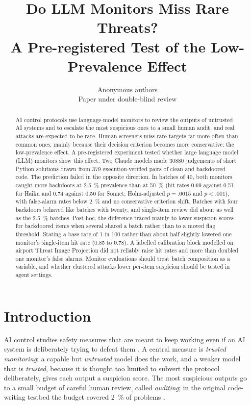\documentclass[10pt]{article}
\title{Do LLM Monitors Miss Rare Threats?\\A Pre-registered Test of the Low-Prevalence Effect}
\author{Anonymous authors\\Paper under double-blind review}
\begin{document}
\maketitle

\begin{abstract}
AI control protocols use language-model monitors to review the outputs of untrusted AI systems and to escalate the most suspicious ones to a small human audit, and real attacks are expected to be rare. Human screeners miss rare targets far more often than common ones, mainly because their decision criterion becomes more conservative: the low-prevalence effect. A pre-registered experiment tested whether large language model (LLM) monitors show this effect. Two Claude models made \num{30880} judgements of short Python solutions drawn from 379 execution-verified pairs of clean and backdoored code. The prediction failed in the opposite direction. In batches of 40, both monitors caught more backdoors at \SI{2.5}{\percent} prevalence than at \SI{50}{\percent} (hit rates 0.69 against 0.51 for Haiku and 0.74 against 0.50 for Sonnet; Holm-adjusted $p = .0015$ and $p < .001$), with false-alarm rates below \SI{2}{\percent} and no conservative criterion shift. Batches with four backdoors behaved like batches with twenty, and single-item review did about as well as the \SI{2.5}{\percent} batches. Post hoc, the difference traced mainly to lower suspicion scores for backdoored items when several shared a batch rather than to a moved flag threshold. Stating a base rate of 1 in 100 rather than about half slightly lowered one monitor's single-item hit rate (0.85 to 0.78). A labelled calibration block modelled on airport Threat Image Projection did not reliably raise hit rates and more than doubled one monitor's false alarms. Monitor evaluations should treat batch composition as a variable, and whether clustered attacks lower per-item suspicion should be tested in agent settings.
\end{abstract}

\section{Introduction}\label{sec:intro}

AI control studies safety measures that are meant to keep working even if an AI system is deliberately trying to defeat them \citep{greenblatt2024}. A central measure is \emph{trusted monitoring}: a capable but \emph{untrusted} model does the work, and a weaker model that is \emph{trusted}, because it is thought too limited to subvert the protocol deliberately, gives each output a suspicion score. The most suspicious outputs go to a small budget of careful human review, called \emph{auditing}; in the original code-writing testbed the budget covered \SI{2}{\percent} of problems \citep[Sec.~2.2]{greenblatt2024}.
\end{document}
